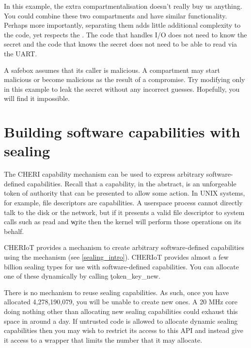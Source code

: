 In this example, the extra compartmentalisation doesn't really buy us anything.
You could combine these two compartments and have similar functionality.
Perhaps more importantly, separating them adds little additional complexity to the code, yet respects the .
The code that handles I/O does not need to know the secret and the code that knows the secret does not need to be able to read via the UART.

A safebox assumes that its caller is malicious.
A compartment may start malicious or become malicious as the result of a compromise.
Try modifying only  in this example to leak the secret without any incorrect guesses.
Hopefully, you will find it impossible.

\section[label=software_capabilities]{Building software capabilities with sealing}

The CHERI capability mechanism can be used to express arbitrary software-defined capabilities.
Recall that a capability, in the abstract, is an unforgeable token of authority that can be presented to allow some action.
In UNIX systems, for example, file descriptors are capabilities.
A userspace process cannot directly talk to the disk or the network, but if it presents a valid file descriptor to system calls such as \c{read} and \c{write} then the kernel will perform those operations on its behalf.

CHERIoT provides a mechanism to create arbitrary software-defined capabilities using the  mechanism (see \ref{sealing_intro}).
CHERIoT provides almost a few billion sealing types for use with software-defined capabilities.
You can allocate one of these dynamically by calling \c{token_key_new}.

\begin{caution}
There is no mechanism to reuse sealing capabilities.
As such, once you have allocated 4,278,190,079, you will be unable to create new ones.
A 20 MHz core doing nothing other than allocating new sealing capabilities could exhaust this space in around a day.
If untrusted code is allowed to allocate dynamic sealing capabilities then you may wish to restrict its access to this API and instead give it access to a wrapper that limits the number that it may allocate.
\end{caution}


